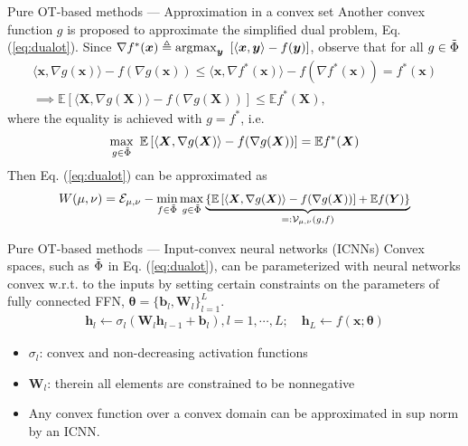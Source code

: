 \documentclass[10pt]{beamer}
\begin{document}
\begin{frame}{Pure OT-based methods --- \normalsize Approximation in a convex set}
    Another convex function $g$ is proposed to approximate the simplified dual problem\cite{pmlr_v119_makkuva20a}, Eq. (\ref{eq:dualot}). 
    Since ${\nabla f^*(\bm{x})\triangleq \argmax_{\bm{y}}\ \left[\langle\bm{x},\bm{y}\rangle - f(\bm{y})\right]}$, observe that for all $g\in\Tilde{\Phi}$
    \begin{gather}
         \langle \bm{x}, \nabla g(\bm{x})\rangle - f(\nabla g(\bm{x})) 
         \leq \langle \bm{x}, \nabla f^*(\bm{x})\rangle - f(\nabla f^*(\bm{x})) 
         = f^*(\bm{x}) \\
         \implies \mathbb{E}\left[\langle\bm{X},\nabla g(\bm{X})\rangle - f(\nabla g(\bm{X}))\right]
         \leq \mathbb{E} f^*(\bm{X}),
    \end{gather}
     where the equality is achieved with $g=f^*$, i.e.
     \begin{gather}
         \max_{g\in\Tilde{\Phi}}\ \mathbb{E}\left[\langle\bm{X},\nabla g(\bm{X})\rangle - f(\nabla g(\bm{X}))\right]
         = \mathbb{E} f^*(\bm{X})
     \end{gather}
     Then Eq. (\ref{eq:dualot}) can be approximated as
     \begin{gather}
     \small
         W(\mu,\nu) = \mathcal{E}_{\mu,\nu} - 
         \min_{f\in\Tilde{\Phi}} \max_{g\in\Tilde{\Phi}}\underbrace{\left\{
            \mathbb{E}\left[\langle\bm{X},\nabla g(\bm{X})\rangle - f(\nabla g(\bm{X}))\right] + 
            \mathbb{E}f(\bm{Y})
        \right\}}_{=:\mathcal{V}_{\mu,\nu}(g,f)}\label{eq:convexot}
     \end{gather}
\end{frame}


\begin{frame}{Pure OT-based methods --- \normalsize Input-convex neural networks (ICNNs)}
    Convex spaces, such as $\Tilde{\Phi}$ in Eq. (\ref{eq:dualot}), can be parameterized with neural networks convex w.r.t. to the inputs 
    by setting certain constraints on the parameters of fully connected FFN, $\bm{\theta}=\{\bm{b}_l,\mathbf{W}_l\}_{l=1}^L$.
    \begin{gather}
        \bm{h}_{l} \gets \sigma_l(\mathbf{W}_l\bm{h}_{l-1} + \bm{b}_l),l=1,\cdots,L;\quad \bm{h}_L \gets f(\bm{x};\bm{\theta})
    \end{gather}
    \begin{itemize}\small
        \item $\sigma_l$: convex and non-decreasing activation functions
        \item $\mathbf{W}_l$: therein all elements are constrained to be nonnegative
    \end{itemize}
    \bigskip
    \begin{itemize}
        \item Any convex function over a convex domain can be approximated in sup norm by an ICNN.
    \end{itemize}
\end{frame}
\end{document}
